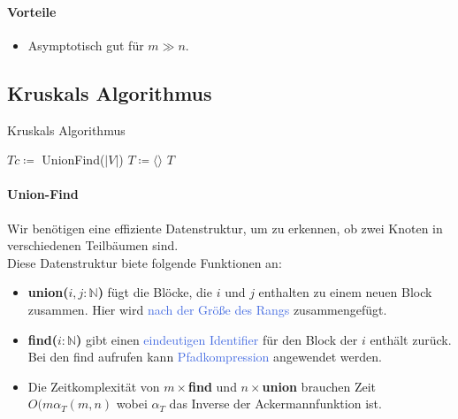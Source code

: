 \documentclass[11pt]{article}
\def \texcol{RoyalBlue}
\begin{document}
\paragraph{Vorteile} 
\begin{itemize}
\item Asymptotisch gut für $m\gg n$.
\end{itemize}

\subsection{Kruskals Algorithmus}
\begin{algorithm}[H]
\caption{Kruskals Algorithmus}
\DontPrintSemicolon
{}
$Tc\coloneqq$ UnionFind($|V|$)\;
$T\coloneqq \langle\rangle$\;
\Return $T$
\end{algorithm}

\paragraph{Union-Find}
Wir benötigen eine effiziente Datenstruktur, um zu erkennen, ob zwei Knoten in verschiedenen Teilbäumen sind.\\
Diese Datenstruktur biete folgende Funktionen an:
\begin{itemize}
\item \textbf{union($i,j\colon\mathbb{N}$)} fügt die Blöcke, die $i$ und $j$ enthalten zu einem neuen Block zusammen. Hier wird \textcolor{\texcol}{nach der Größe des Rangs} zusammengefügt.
\item \textbf{find($i\colon\mathbb{N}$)} gibt einen \textcolor{\texcol}{eindeutigen Identifier} für den Block der $i$ enthält zurück. Bei den find aufrufen kann \textcolor{\texcol}{Pfadkompression} angewendet werden.
\item Die Zeitkomplexität von $m\times$\textbf{find} und $n\times$\textbf{union} brauchen Zeit $O(m\alpha_T(m,n)$ wobei $\alpha_T$ das Inverse der Ackermannfunktion ist.
\end{itemize}
\end{document}
